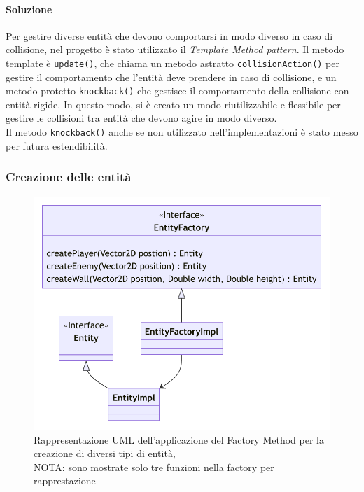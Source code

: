 \documentclass[a4paper,12pt]{report}
\begin{document}
\paragraph{Soluzione} Per gestire diverse entità che devono comportarsi in modo diverso in caso di collisione, nel progetto è 
stato utilizzato il \textit{Template Method pattern}. Il metodo template è \texttt{update()}, che chiama un metodo astratto \texttt{collisionAction()} 
per gestire il comportamento che l'entità deve prendere in caso di collisione, e un metodo protetto \texttt{knockback()} che gestisce il 
comportamento della collisione con entità rigide. In questo modo, si è creato un modo riutilizzabile e flessibile per gestire le 
collisioni tra entità che devono agire in modo diverso. \\
Il metodo \texttt{knockback()} anche se non utilizzato nell’implementazioni è stato messo per futura estendibilità.

\subsubsection{Creazione delle entità}

\begin{figure}[H]
\centering{}
\includegraphics[width=\textwidth]{img/EntityFactoryUML.pdf}
\caption{Rappresentazione UML dell'applicazione del Factory Method per la creazione di diversi tipi di entità, 
\\NOTA: sono mostrate solo tre funzioni nella factory per rapprestazione}
\end{figure}
	
\end{document}
